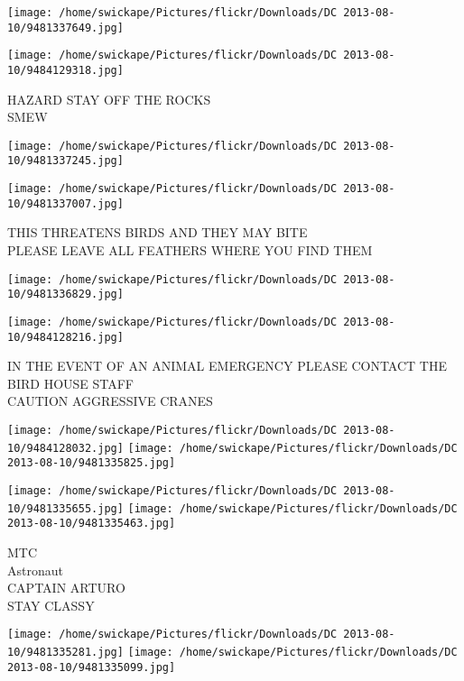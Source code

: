 \documentclass[10pt,letterpaper]{article}
\begin{document}
\texttt{[image: /home/swickape/Pictures/flickr/Downloads/DC 2013-08-10/9481337649.jpg]}

\vspace{0.25in}
\texttt{[image: /home/swickape/Pictures/flickr/Downloads/DC 2013-08-10/9484129318.jpg]}

HAZARD STAY OFF THE ROCKS\\
SMEW\\
\pagebreak

\texttt{[image: /home/swickape/Pictures/flickr/Downloads/DC 2013-08-10/9481337245.jpg]}

\vspace{0.25in}
\texttt{[image: /home/swickape/Pictures/flickr/Downloads/DC 2013-08-10/9481337007.jpg]}

THIS THREATENS BIRDS AND THEY MAY BITE\\
PLEASE LEAVE ALL FEATHERS WHERE YOU FIND THEM\\
\pagebreak

\texttt{[image: /home/swickape/Pictures/flickr/Downloads/DC 2013-08-10/9481336829.jpg]}

\vspace{0.25in}
\texttt{[image: /home/swickape/Pictures/flickr/Downloads/DC 2013-08-10/9484128216.jpg]}

IN THE EVENT OF AN ANIMAL EMERGENCY PLEASE CONTACT THE BIRD HOUSE STAFF\\
CAUTION AGGRESSIVE CRANES\\
\pagebreak

\texttt{[image: /home/swickape/Pictures/flickr/Downloads/DC 2013-08-10/9484128032.jpg]}
\texttt{[image: /home/swickape/Pictures/flickr/Downloads/DC 2013-08-10/9481335825.jpg]}

\texttt{[image: /home/swickape/Pictures/flickr/Downloads/DC 2013-08-10/9481335655.jpg]}
\texttt{[image: /home/swickape/Pictures/flickr/Downloads/DC 2013-08-10/9481335463.jpg]}

MTC\\
Astronaut\\
CAPTAIN ARTURO\\
STAY CLASSY\\
\pagebreak

\texttt{[image: /home/swickape/Pictures/flickr/Downloads/DC 2013-08-10/9481335281.jpg]}
\texttt{[image: /home/swickape/Pictures/flickr/Downloads/DC 2013-08-10/9481335099.jpg]}
\end{document}
